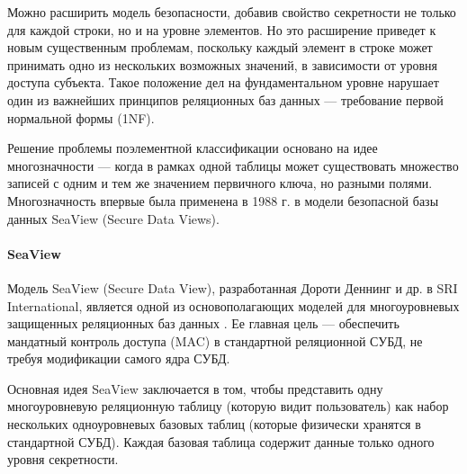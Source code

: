 Можно расширить модель безопасности, добавив свойство секретности не только для каждой строки, но и на уровне элементов. Но это расширение приведет к новым существенным проблемам, поскольку каждый элемент в строке может принимать одно из нескольких возможных значений, в зависимости от уровня доступа субъекта. Такое положение дел на фундаментальном уровне нарушает один из важнейших принципов реляционных баз данных --- требование первой нормальной формы (1NF)\footnotemark.


Решение проблемы поэлементной классификации основано на идее многозначности ---  когда в рамках одной таблицы может существовать множество записей с одним и тем же значением первичного ключа, но разными полями.  Многозначность впервые была применена в 1988 г. в модели безопасной базы данных SeaView (Secure Data Views).

\paragraph{SeaView}\label{par:seaview}
Модель SeaView (Secure Data View), разработанная Дороти Деннинг и др. в SRI International, является одной из основополагающих моделей для многоуровневых защищенных реляционных баз данных \autocite{denning1987seaview}. Ее главная цель --- обеспечить мандатный контроль доступа (MAC) в стандартной реляционной СУБД, не требуя модификации самого ядра СУБД.

Основная идея SeaView заключается в том, чтобы представить одну многоуровневую реляционную таблицу (которую видит пользователь) как набор нескольких одноуровневых базовых таблиц (которые физически хранятся в стандартной СУБД). Каждая базовая таблица содержит данные только одного уровня секретности.

